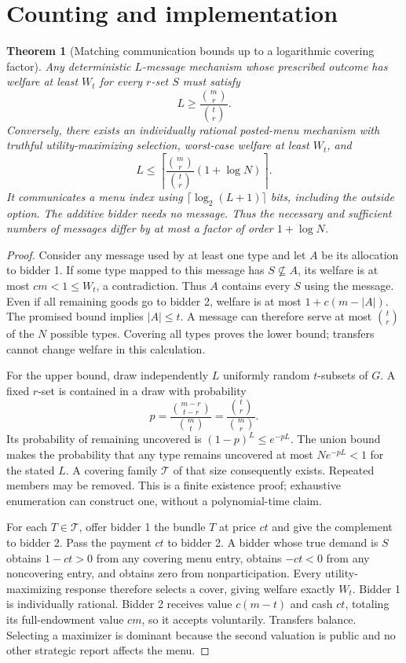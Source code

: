 \documentclass[11pt,a4paper]{article}
\newtheorem{theorem}{Theorem}[section]
\theoremstyle{remark}
\begin{document}
\section{Counting and implementation}
\begin{theorem}[Matching communication bounds up to a logarithmic covering factor]
Any deterministic $L$-message mechanism whose prescribed outcome has welfare at least $W_t$ for every $r$-set $S$ must satisfy
\[
 L\ge\frac{\binom mr}{\binom tr}.
\]
Conversely, there exists an individually rational posted-menu mechanism with truthful utility-maximizing selection, worst-case welfare at least $W_t$, and
\[
 L\le\left\lceil\frac{\binom mr}{\binom tr}(1+\log N)\right\rceil.
\]
It communicates a menu index using $\lceil\log_2(L+1)\rceil$ bits, including the outside option. The additive bidder needs no message. Thus the necessary and sufficient numbers of messages differ by at most a factor of order $1+\log N$.
\end{theorem}
\begin{proof}
Consider any message used by at least one type and let $A$ be its allocation to bidder 1. If some type mapped to this message has $S\not\subseteq A$, its welfare is at most $cm<1\le W_t$, a contradiction. Thus $A$ contains every $S$ using the message. Even if all remaining goods go to bidder 2, welfare is at most $1+c(m-|A|)$. The promised bound implies $|A|\le t$. A message can therefore serve at most $\binom tr$ of the $N$ possible types. Covering all types proves the lower bound; transfers cannot change welfare in this calculation.

For the upper bound, draw independently $L$ uniformly random $t$-subsets of $G$. A fixed $r$-set is contained in a draw with probability
\[
 p=\frac{\binom{m-r}{t-r}}{\binom mt}=\frac{\binom tr}{\binom mr}.
\]
Its probability of remaining uncovered is $(1-p)^L\le e^{-pL}$. The union bound makes the probability that any type remains uncovered at most $Ne^{-pL}<1$ for the stated $L$. A covering family $\mathcal T$ of that size consequently exists. Repeated members may be removed. This is a finite existence proof; exhaustive enumeration can construct one, without a polynomial-time claim.

For each $T\in\mathcal T$, offer bidder 1 the bundle $T$ at price $ct$ and give the complement to bidder 2. Pass the payment $ct$ to bidder 2. A bidder whose true demand is $S$ obtains $1-ct>0$ from any covering menu entry, obtains $-ct<0$ from any noncovering entry, and obtains zero from nonparticipation. Every utility-maximizing response therefore selects a cover, giving welfare exactly $W_t$. Bidder 1 is individually rational. Bidder 2 receives value $c(m-t)$ and cash $ct$, totaling its full-endowment value $cm$, so it accepts voluntarily. Transfers balance. Selecting a maximizer is dominant because the second valuation is public and no other strategic report affects the menu.
\end{proof}
\end{document}
